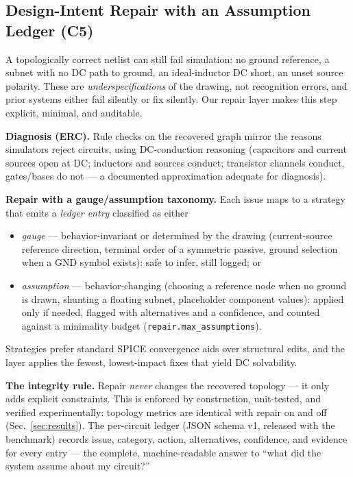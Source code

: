 \subsection{Design-Intent Repair with an Assumption Ledger (C5)}
\label{sec:method-repair}
A topologically correct netlist can still fail simulation: no ground
reference, a subnet with no DC path to ground, an ideal-inductor DC
short, an unset source polarity. These are \emph{underspecifications}
of the drawing, not recognition errors, and prior systems either fail
silently or fix silently. Our repair layer makes this step explicit,
minimal, and auditable.

\textbf{Diagnosis (ERC).} Rule checks on the recovered graph mirror
the reasons simulators reject circuits, using DC-conduction reasoning
(capacitors and current sources open at DC; inductors and sources
conduct; transistor channels conduct, gates/bases do not — a
documented approximation adequate for diagnosis).

\textbf{Repair with a gauge/assumption taxonomy.} Each issue maps to a
strategy that emits a \emph{ledger entry} classified as either
\begin{itemize}
  \item \emph{gauge} — behavior-invariant or determined by the drawing
  (current-source reference direction, terminal order of a symmetric
  passive, ground selection when a GND symbol exists): safe to infer,
  still logged; or
  \item \emph{assumption} — behavior-changing (choosing a reference
  node when no ground is drawn, shunting a floating subnet,
  placeholder component values): applied only if needed, flagged with
  alternatives and a confidence, and counted against a minimality
  budget (\texttt{repair.max\_assumptions}).
\end{itemize}
Strategies prefer standard SPICE convergence aids \cite{ngspice} over
structural edits, and the layer applies the fewest, lowest-impact
fixes that yield DC solvability.

\textbf{The integrity rule.} Repair \emph{never} changes the recovered
topology — it only adds explicit constraints. This is enforced by
construction, unit-tested, and verified experimentally: topology
metrics are identical with repair on and off
(Sec.~\ref{sec:results}). The per-circuit ledger (JSON schema v1,
released with the benchmark) records issue, category, action,
alternatives, confidence, and evidence for every entry — the complete,
machine-readable answer to ``what did the system assume about my
circuit?''
